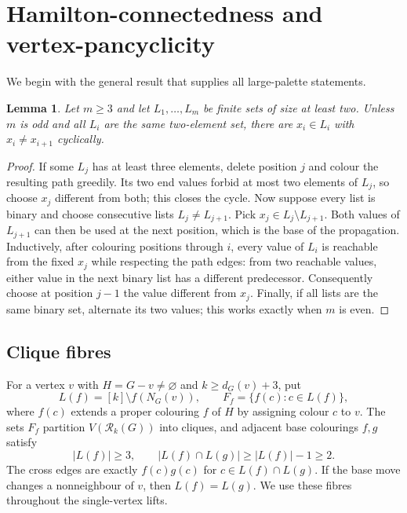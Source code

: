 \documentclass[11pt]{article}
\newtheorem{lemma}[theorem]{Lemma}
\theoremstyle{remark}
\newcommand{\Rk}{\mathcal R_k}
\numberwithin{equation}{section}
\numberwithin{table}{section}
\begin{document}
\section{Hamilton-connectedness and vertex-pancyclicity}
\label{sec:degenerate}

We begin with the general result that supplies all large-palette statements.

\begin{lemma}
\label{lem:list-cycle}
Let $m\ge3$ and let $L_1,\ldots,L_m$ be finite sets of size at least two.  Unless $m$ is odd and all $L_i$ are the same two-element set, there are $x_i\in L_i$ with $x_i\ne x_{i+1}$ cyclically.
\end{lemma}

\begin{proof}
If some $L_j$ has at least three elements, delete position $j$ and
colour the resulting path greedily.  Its two end values forbid at most
two elements of $L_j$, so choose $x_j$ different from both; this closes
the cycle.  Now suppose every list is binary and choose consecutive
lists $L_j\ne L_{j+1}$.  Pick $x_j\in L_j\setminus L_{j+1}$.
Both values of $L_{j+1}$ can then be used at the next position,
which is the base of the propagation.  Inductively, after colouring
positions through $i$, every value of
$L_i$ is reachable from the fixed $x_j$ while respecting the path
edges: from two reachable values, either value in the next binary list
has a different predecessor.  Consequently choose at position $j-1$
the value different from $x_j$.  Finally, if all lists are the same
binary set, alternate its two values; this works exactly when $m$ is
even.
\end{proof}

\subsection{Clique fibres}
For a vertex $v$ with $H=G-v\ne\varnothing$ and $k\ge d_G(v)+3$, put
\[
 L(f)=[k]\setminus f(N_G(v)),\qquad
 F_f=\{f(c):c\in L(f)\},
\]
where $f(c)$ extends a proper colouring $f$ of $H$ by assigning colour
$c$ to $v$. The sets $F_f$ partition $V(\Rk(G))$ into cliques, and
adjacent base colourings $f,g$ satisfy
\begin{equation}\label{eq:clique-fibres}
 |L(f)|\ge3,\qquad |L(f)\cap L(g)|\ge |L(f)|-1\ge2.
\end{equation}
The cross edges are exactly $f(c)g(c)$ for $c\in L(f)\cap L(g)$.
If the base move changes a nonneighbour of $v$, then $L(f)=L(g)$.
We use these fibres throughout the single-vertex lifts.
\end{document}

